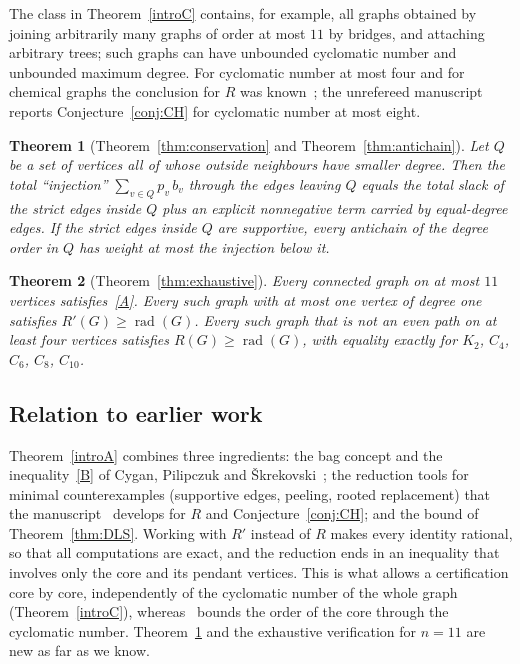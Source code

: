 \documentclass[11pt]{amsart}
\newtheorem{introthm}{Theorem}
\theoremstyle{definition}
\DeclareMathOperator{\rad}{rad}
\newcommand{\Rp}{R'}
\newcommand{\kmax}{11}
\begin{document}
The class in Theorem~\ref{introC} contains, for example, all graphs obtained by joining arbitrarily many graphs of
order at most $\kmax$ by bridges, and attaching arbitrary trees; such graphs can have unbounded cyclomatic number and
unbounded maximum degree. For cyclomatic number at most four and for chemical graphs the conclusion for $R$ was
known~\cite{DTZ,CPS}; the unrefereed manuscript~\cite{Corpus054} reports Conjecture~\ref{conj:CH} for cyclomatic number at
most eight.

\begin{introthm}[Theorem~\ref{thm:conservation} and Theorem~\ref{thm:antichain}]\label{introD}
Let $Q$ be a set of vertices all of whose outside neighbours have smaller degree. Then the total ``injection''
$\sum_{v\in Q}p_v\,b_v$ through the edges leaving $Q$ equals the total slack of the strict edges inside $Q$ plus an
explicit nonnegative term carried by equal-degree edges. If the strict edges inside $Q$ are supportive, every antichain of
the degree order in $Q$ has weight at most the injection below it.
\end{introthm}

\begin{introthm}[Theorem~\ref{thm:exhaustive}]\label{introE}
Every connected graph on at most $11$ vertices satisfies~\eqref{A}. Every such graph with at most one vertex of degree
one satisfies $\Rp(G)\ge\rad(G)$. Every such graph that is not an even path on at least four vertices satisfies
$R(G)\ge\rad(G)$, with equality exactly for $K_2$, $C_4$, $C_6$, $C_8$, $C_{10}$.
\end{introthm}

\subsection*{Relation to earlier work}
Theorem~\ref{introA} combines three ingredients: the bag concept and the inequality~\eqref{B} of Cygan, Pilipczuk and
\v{S}krekovski~\cite{CPS}; the reduction tools for minimal counterexamples (supportive edges, peeling, rooted replacement)
that the manuscript~\cite{Corpus054} develops for $R$ and Conjecture~\ref{conj:CH}; and the bound of
Theorem~\ref{thm:DLS}. Working with $\Rp$ instead of $R$ makes every identity rational, so that all computations are exact,
and the reduction ends in an inequality that involves only the core and its pendant vertices. This is what allows a
certification core by core,
independently of the cyclomatic number of the whole graph (Theorem~\ref{introC}), whereas~\cite{Corpus054} bounds the
order of the core through the cyclomatic number. Theorem~\ref{introD} and the exhaustive verification for $n=11$ are new as
far as we know.
\end{document}
